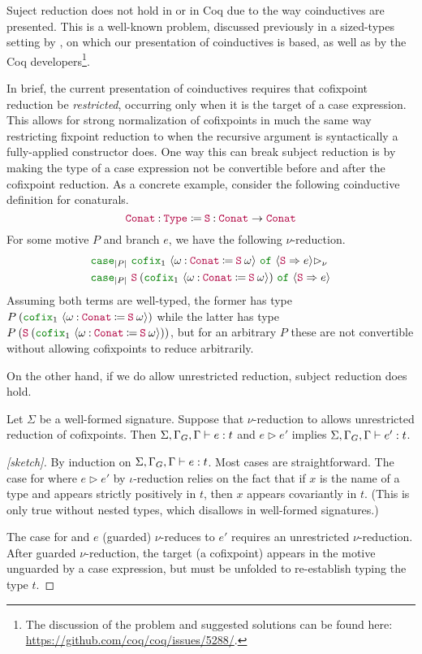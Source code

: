 Suject reduction does not hold in \lang or in Coq due to the way coinductives are presented.
This is a well-known problem, discussed previously in a sized-types setting by \citet{cc-hat-omega},
on which our presentation of coinductives is based,
as well as by the Coq developers\footnote{The discussion of the problem and suggested solutions can be found here: \url{https://github.com/coq/coq/issues/5288/}.}.

In brief, the current presentation of coinductives requires that cofixpoint reduction be \textit{restricted},
\ie occurring only when it is the target of a case expression.
This allows for strong normalization of cofixpoints in much the same way restricting fixpoint reduction to when the recursive argument is syntactically a fully-applied constructor does.
One way this can break subject reduction is by making the type of a case expression not be convertible before and after the cofixpoint reduction.
As a concrete example, consider the following coinductive definition for conaturals.
\begin{displaymath}
  \defn{\Conat}{\Type{}}{\assm{\Succ}{\Conat \to \Conat}}
\end{displaymath}
For some motive $P$ and branch $e$, we have the following $\nu$-reduction.
\begin{align*}
  &\caseof{\erase{P}}{\cofix{1}{\omega}{\Conat}{\app{\Succ}{\omega}}}{\Succ}{e} \rhd_\nu \\
  &\caseof{\erase{P}}{\app{\Succ}{(\cofix{1}{\omega}{\Conat}{\app{\Succ}{\omega}})}}{\Succ}{e}
\end{align*}
Assuming both terms are well-typed, the former has type $\app{P}{(\cofix{1}{\omega}{\Conat}{\app{\Succ}{\omega}})}$ while the latter has type $\app{P}{(\app{\Succ}{(\cofix{1}{\omega}{\Conat}{\app{\Succ}{\omega}})})}$, but for an arbitrary $P$ these are not convertible without allowing cofixpoints to reduce arbitrarily.

On the other hand, if we do allow unrestricted reduction, subject reduction does hold.

\begin{theorem}
  \label{thm:metatheory:sr}
  Let $\Sigma$ be a well-formed signature.
  Suppose that $\nu$-reduction to allows unrestricted reduction of cofixpoints.
  Then $\Sigma, \Gamma_G, \Gamma \vdash e : t$ and $e \rhd e'$ implies $\Sigma, \Gamma_G, \Gamma \vdash e' : t$.
\end{theorem}

\begin{proof}[{[sketch]}]
  By induction on $\Sigma, \Gamma_G, \Gamma \vdash e : t$.
  Most cases are straightforward.
  The case for  where $e \rhd e'$ by $\iota$-reduction relies on the fact that
  if $x$ is the name of a \coinductive type and appears strictly positively in $t$,
  then $x$ appears covariantly in $t$.
  (This is only true without nested \coinductive types, which \lang disallows in well-formed signatures.)

  The case for  and $e$ (guarded) $\nu$-reduces to $e'$ requires an unrestricted $\nu$-reduction.
  After guarded $\nu$-reduction, the target (a cofixpoint) appears in the motive unguarded by a case expression, but must be unfolded to re-establish typing the type $t$.
\end{proof}

